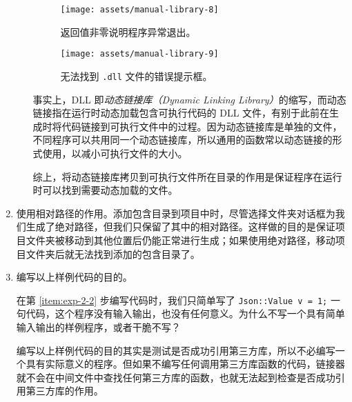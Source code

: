 \begin{enumerate}
\begin{enumerate}
		\begin{figure}
			\centering
			\texttt{[image: assets/manual-library-8]}
			\caption{返回值非零说明程序异常退出。}
			\label{fig:manual-library-8}
		\end{figure}

		\begin{figure}
			\centering
			\texttt{[image: assets/manual-library-9]}
			\caption{无法找到 \lstinline[language={}]{.dll} 文件的错误提示框。}
			\label{fig:manual-library-9}
		\end{figure}

		事实上，DLL 即\emph{动态链接库（Dynamic Linking Library）}的缩写，而动态链接指在运行时动态加载包含可执行代码的 DLL 文件，有别于此前在生成时将代码链接到可执行文件中的过程。因为动态链接库是单独的文件，不同程序可以共用同一个动态链接库，所以通用的函数常以动态链接的形式使用，以减小可执行文件的大小。

		综上，将动态链接库拷贝到可执行文件所在目录的作用是保证程序在运行时可以找到需要动态加载的文件。
	\end{enumerate}

	\item 使用相对路径的作用。添加包含目录到项目中时，尽管选择文件夹对话框为我们生成了绝对路径，但我们只保留了其中的相对路径。这样做的目的是保证项目文件夹被移动到其他位置后仍能正常进行生成；如果使用绝对路径，移动项目文件夹后就无法找到添加的包含目录了。

	\item 编写以上样例代码的目的。

	在第 \ref{item:exp-2-2} 步编写代码时，我们只简单写了 \lstinline[language={[17]C++}, moreemph={[1]Value}]{Json::Value v = 1;} 一句代码，这个程序没有输入输出，也没有任何意义。为什么不写一个具有简单输入输出的样例程序，或者干脆不写？

	编写以上样例代码的目的其实是测试是否成功引用第三方库，所以不必编写一个具有实际意义的程序。但如果不编写任何调用第三方库函数的代码，链接器就不会在中间文件中查找任何第三方库的函数，也就无法起到检查是否成功引用第三方库的作用。
\end{enumerate}

